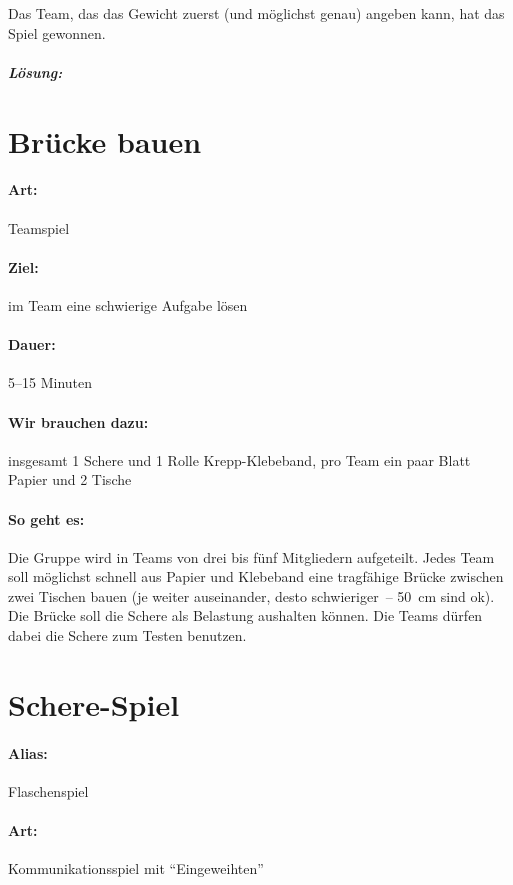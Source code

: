 Das Team, das das Gewicht zuerst (und möglichst genau) angeben kann, hat das Spiel gewonnen.

\subparagraph{Lösung:}

\section{Brücke bauen}
\paragraph{Art:} Teamspiel
\paragraph{Ziel:} im Team eine schwierige Aufgabe lösen
\paragraph{Dauer:} 5--15 Minuten
\paragraph{Wir brauchen dazu:} insgesamt 1 Schere und 1 Rolle Krepp-Klebeband, pro Team ein paar Blatt Papier und 2 Tische
\paragraph{So geht es:} Die Gruppe wird in Teams von drei bis fünf Mitgliedern aufgeteilt. Jedes Team soll möglichst schnell aus Papier und Klebeband eine tragfähige Brücke zwischen zwei Tischen bauen (je weiter auseinander, desto schwieriger~-- 50~cm sind ok). Die Brücke soll die Schere als Belastung aushalten können. Die Teams dürfen dabei die Schere zum Testen benutzen.

\section{Schere-Spiel}
\label{flaschenspiel}
\paragraph{Alias:} Flaschenspiel
\paragraph{Art:} Kommunikationsspiel mit "`Eingeweihten"'

